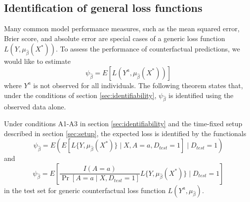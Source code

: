     \subsection{Identification of general loss functions}\label{sec:tf_proof}
    Many common model performance measures, such as the mean squared error, Brier score, and absolute error are special cases of a generic loss function $L(Y, \mu_{\widehat{\beta}}(X^*))$. To assess the performance of counterfactual predictions, we would like to estimate 
    $$\psi_{\widehat{\beta}} = E[L(Y^a, \mu_{\widehat{\beta}}(X^*))]$$
    where $Y^a$ is not observed for all individuals. The following theorem states that, under the conditions of section \ref{sec:identifiability}, $\psi_{\widehat{\beta}}$ is identified using the observed data alone. 
    \begin{theorem}
        Under conditions A1-A3 in section \ref{sec:identifiability} and the time-fixed setup described in section \ref{sec:setup}, the expected loss is identified by the functionals
        \begin{equation}\label{eqn:app_cl_estimand}
            \psi_{\widehat{\beta}} = E\left(E[L\{Y, \mu_{\widehat{\beta}}(X^*)\} \mid X, A=a, D_{test} = 1] \mid D_{test} = 1\right)
        \end{equation}
        and 
        \begin{equation}\label{eqn:app_ipw_estimand}
            \psi_{\widehat{\beta}} = E\left[\frac{I(A = a)}{\Pr[A = a \mid X, D_{test} = 1]}L\{Y, \mu_{\widehat{\beta}}(X^*)\} \mid D_{test} = 1\right]
        \end{equation}
        in the test set for generic counterfactual loss function $L(Y^{a}, \mu_{\widehat{\beta}})$.
    \end{theorem}
    

